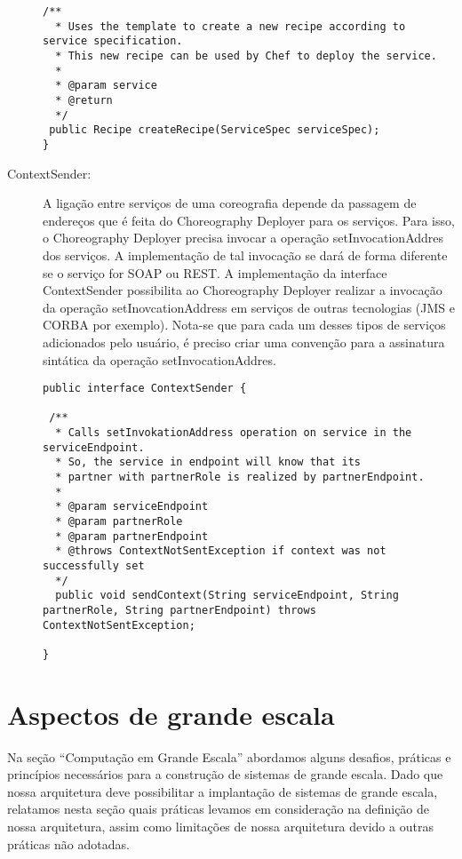 \begin{description}
\begin{lstlisting}[frame=trbl, label=lst:recipe_builder, caption=Interface RecipeBuilder]
 /**
  * Uses the template to create a new recipe according to service specification.
  * This new recipe can be used by Chef to deploy the service.
  * 
  * @param service
  * @return
  */
 public Recipe createRecipe(ServiceSpec serviceSpec);
}
\end{lstlisting}

\item [ContextSender:]

A ligação entre serviços de uma coreografia depende da passagem de endereços que é feita do Choreography Deployer para os serviços. Para isso, o Choreography Deployer precisa invocar a operação setInvocationAddres dos serviços. A implementação de tal invocação se dará de forma diferente se o serviço for SOAP ou REST. A implementação da interface ContextSender possibilita ao Choreography Deployer realizar a invocação da operação setInovcationAddress em serviços de outras tecnologias (JMS e CORBA por exemplo). Nota-se que para cada um desses tipos de serviços adicionados pelo usuário, é preciso criar uma convenção para a assinatura sintática da operação setInvocationAddres.

\begin{lstlisting}[frame=trbl, label=lst:context_sender, caption=Interface ContextSender]
public interface ContextSender {
	
 /**
  * Calls setInvokationAddress operation on service in the serviceEndpoint.
  * So, the service in endpoint will know that its
  * partner with partnerRole is realized by partnerEndpoint.
  * 
  * @param serviceEndpoint
  * @param partnerRole
  * @param partnerEndpoint
  * @throws ContextNotSentException if context was not successfully set
  */
  public void sendContext(String serviceEndpoint, String partnerRole, String partnerEndpoint) throws ContextNotSentException;

}
\end{lstlisting}

\end{description}

\section{Aspectos de grande escala}
\label{sec:solucao_grande_escala}


Na seção ``Computação em Grande Escala'' abordamos alguns desafios, práticas e princípios necessários para a construção de sistemas de grande escala. Dado que nossa arquitetura deve possibilitar a implantação de sistemas de grande escala, relatamos nesta seção quais práticas levamos em consideração na definição de nossa arquitetura, assim como limitações de nossa arquitetura devido a outras práticas não adotadas.

